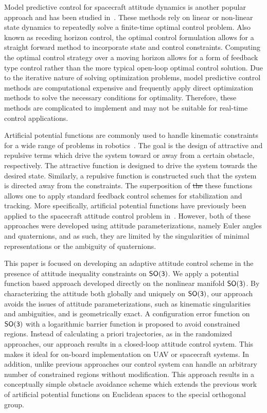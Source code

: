 \documentclass[10pt,fleqn]{IJCAS}  %
\providecommand{\DIFdel}[1]{{\protect\color{red}\sout{#1}}}                      %
\providecommand{\DIFdelbegin}{} %
\providecommand{\DIFdelend}{} %
\begin{document}
\begin{multicols}{2}
Model predictive control for spacecraft attitude dynamics is another popular approach and has been studied in~\cite{guiggiani2014,kalabic2014,gupta2015}.
These methods rely on linear or non-linear state dynamics to repeatedly solve a finite-time optimal control problem.
Also known as receding horizon control, the optimal control formulation allows for a straight forward method to incorporate state and control constraints.
Computing the optimal control strategy over a moving horizon allows for a form of feedback type control rather than the more typical open-loop optimal control solution.
Due to the iterative nature of solving optimization problems, model predictive control methods are computational expensive and frequently apply direct optimization methods to solve the necessary conditions for optimality.
Therefore, these methods are complicated to implement and may not be suitable for real-time control applications.

Artificial potential functions are commonly used to handle kinematic constraints for a wide range of problems in robotics~\cite{rimon1992}.
The goal is the design of attractive and repulsive terms which drive the system toward or away from a certain obstacle, respectively.
The attractive function is designed to drive the system towards the desired state.
Similarly, a repulsive function is constructed such that the system is directed away from the constraints. 
The superposition of \DIFdelbegin \DIFdel{the }\DIFdelend these functions allows one to apply standard feedback control schemes for stabilization and tracking.
More specifically, artificial potential functions have previously been applied to the spacecraft attitude control problem in~\cite{lee2011b,mcinnes1994}.
However, both of these approaches were developed using attitude parameterizations, namely Euler angles and quaternions, and as such, they are limited by the singularities of minimal representations or the ambiguity of quaternions.

This paper is focused on developing an adaptive attitude control scheme in the presence of attitude inequality constraints on \(\mathsf{SO(3)}\).
We apply a potential function based approach developed directly on the nonlinear manifold \(\mathsf{SO(3)}\). 
By characterizing the attitude both globally and uniquely on \(\mathsf{SO(3)}\), our approach avoids the issues of attitude parameterizations, such as kinematic singularities and ambiguities, and is geometrically exact. 
A configuration error function on \(\mathsf{SO(3)}\) with a logarithmic barrier function is proposed to avoid constrained regions. 
Instead of calculating a priori trajectories, as in the randomized approaches, our approach results in a closed-loop attitude control system. 
This makes it ideal for on-board implementation on UAV or spacecraft systems. 
In addition, unlike previous approaches our control system can handle an arbitrary number of constrained regions without modification.
This approach results in a conceptually simple obstacle avoidance scheme which extends the previous work of artificial potential functions on Euclidean spaces to the special orthogonal group.


\end{multicols}
\end{document}
